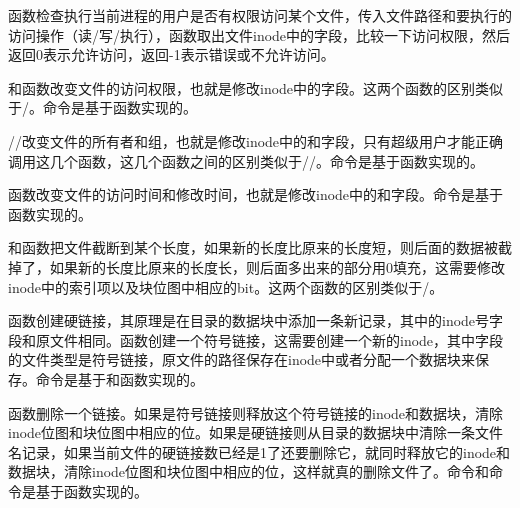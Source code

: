 函数检查执行当前进程的用户是否有权限访问某个文件，传入文件路径和要执行的访问操作（读/写/执行），函数取出文件inode中的字段，比较一下访问权限，然后返回0表示允许访问，返回-1表示错误或不允许访问。



和函数改变文件的访问权限，也就是修改inode中的字段。这两个函数的区别类似于/。命令是基于函数实现的。



//改变文件的所有者和组，也就是修改inode中的和字段，只有超级用户才能正确调用这几个函数，这几个函数之间的区别类似于//。命令是基于函数实现的。



函数改变文件的访问时间和修改时间，也就是修改inode中的和字段。命令是基于函数实现的。



和函数把文件截断到某个长度，如果新的长度比原来的长度短，则后面的数据被截掉了，如果新的长度比原来的长度长，则后面多出来的部分用0填充，这需要修改inode中的索引项以及块位图中相应的bit。这两个函数的区别类似于/。



函数创建硬链接，其原理是在目录的数据块中添加一条新记录，其中的inode号字段和原文件相同。函数创建一个符号链接，这需要创建一个新的inode，其中字段的文件类型是符号链接，原文件的路径保存在inode中或者分配一个数据块来保存。命令是基于和函数实现的。



函数删除一个链接。如果是符号链接则释放这个符号链接的inode和数据块，清除inode位图和块位图中相应的位。如果是硬链接则从目录的数据块中清除一条文件名记录，如果当前文件的硬链接数已经是1了还要删除它，就同时释放它的inode和数据块，清除inode位图和块位图中相应的位，这样就真的删除文件了。命令和命令是基于函数实现的。



